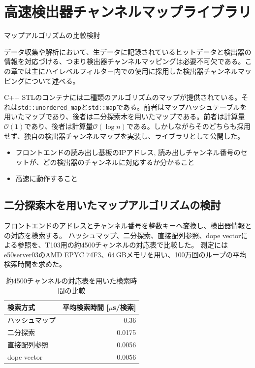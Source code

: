 \documentclass[../main.tex]{subfiles}
\begin{document}
\clearpage
\appendix
\section{高速検出器チャンネルマップライブラリ}
\label{sec:appendixA}
マップアルゴリズムの比較検討

データ収集や解析において、生データに記録されているヒットデータと検出器の情報を対応づける、つまり検出器チャンネルマッピングは必要不可欠である。この章では主にハイレベルフィルター内での使用に採用した検出器チャンネルマッピングについて述べる。

C++ STLのコンテナには二種類のアルゴリズムのマップが提供されている。それは\lstinline|std::unordered_map|と\lstinline|std::map|である。前者はマップハッシュテーブルを用いたマップであり、後者は二分探索木を用いたマップである。前者は計算量$\mathcal{O}(1)$であり、後者は計算量$\mathcal{O}(\log n)$である。しかしながらそのどちらも採用せず、独自の検出器チャンネルマップを実装し、ライブラリとして公開した。
\begin{itemize}
  \item フロントエンドの読み出し基板のIPアドレス, 読み出しチャンネル番号のセットが、どの検出器のチャンネルに対応するか分かること
  \item 高速に動作すること
\end{itemize}
\subsection{二分探索木を用いたマップアルゴリズムの検討}
フロントエンドのアドレスとチャンネル番号を整数キーへ変換し、検出器情報との対応を検索する。
ハッシュマップ、二分探索、直接配列参照、dope vectorによる参照を、T103用の約4500チャンネルの対応表で比較した。
測定にはe50server03のAMD EPYC 74F3、64\,GBメモリを用い、100万回のループの平均検索時間を求めた\cite{kashima:channel2026}。

\begin{table}[htbp]
  \centering
  \caption{約4500チャンネルの対応表を用いた検索時間の比較}
  \label{tab:channel-map-lookup}
  \begin{tabular}{lr}
    \hline
    検索方式 & 平均検索時間 [$\mu$s/検索] \\
    \hline
    ハッシュマップ & 0.36 \\
    二分探索 & 0.0175 \\
    直接配列参照 & 0.0056 \\
    dope vector & 0.0056 \\
    \hline
  \end{tabular}
\end{table}
\end{document}
